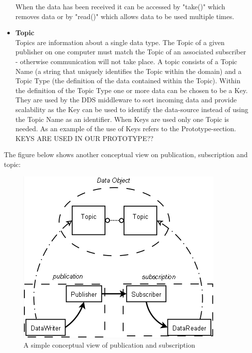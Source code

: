 \documentclass[Main]{subfiles}
\begin{document}
\begin{itemize}
\begin{itemize}
  \end{itemize}
  When the data has been received it can be accessed by "take()" which removes data or by "read()" which allows data to be used multiple times.
  \item \textbf{Topic}\\Topics are information about a single data type. The Topic of a given publisher on one computer must match the Topic of an associated subscriber - otherwise communication will not take place. A topic consists of a Topic Name (a string that uniquely identifies the Topic within the domain) and a Topic Type (the definition of the data contained within the Topic). Within the definition of the Topic Type one or more data can be chosen to be a Key. They are used by the DDS middleware to sort incoming data and provide scalability as the Key can be used to identify the data-source instead of using the Topic Name as an identifier. When Keys are used only one Topic is needed. As an example of the use of Keys refers to the Prototype-section. KEYS ARE USED IN OUR PROTOTYPE??
  \\\cite{RTI} \cite{opendds} \cite{DDS-slides}
\end{itemize}

The figure below shows another conceptual view on publication, subscription and topic: 

\begin{figure}[H]
\centering
\includegraphics[scale=0.7]{Figure/PublicationAndSubscription.png}
\caption{A simple conceptual view of publication and subscription \cite{ddsopen}}
\end{figure}
\end{document}

